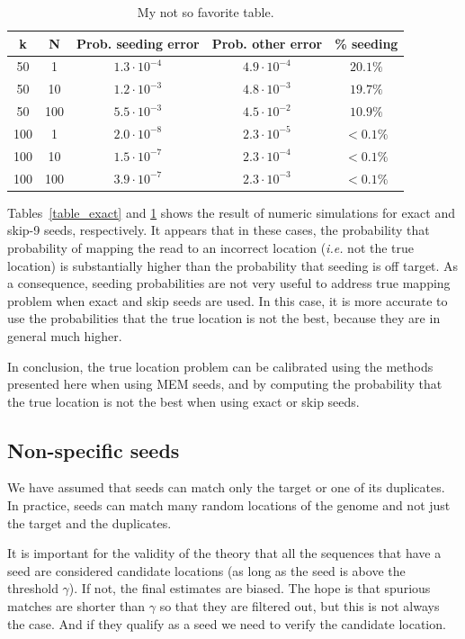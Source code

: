 \documentclass{article}
\begin{document}
\begin{table}
\renewcommand{\arraystretch}{1.1}
\centering
\begin{tabular}{ccccc}
k & N & Prob. seeding error & Prob. other error & \% seeding \\
\hline
50  &  1  & $1.3 \cdot 10^{-4}$ & $4.9 \cdot 10^{-4}$ & $20.1\%$ \\
50  & 10  & $1.2 \cdot 10^{-3}$ & $4.8 \cdot 10^{-3}$ & $19.7\%$ \\
50  & 100 & $5.5 \cdot 10^{-3}$ & $4.5 \cdot 10^{-2}$ & $10.9\%$ \\
100 &  1  & $2.0 \cdot 10^{-8}$ & $2.3 \cdot 10^{-5}$ & $< 0.1\%$ \\
100 & 10  & $1.5 \cdot 10^{-7}$ & $2.3 \cdot 10^{-4}$ & $< 0.1\%$ \\
100 & 100 & $3.9 \cdot 10^{-7}$ & $2.3 \cdot 10^{-3}$ & $< 0.1\%$
\end{tabular}
\caption{My not so favorite table.}
\label{table_skip}
\end{table}

Tables~\ref{table_exact} and \ref{table_skip} shows the result of numeric
simulations for exact and skip-9 seeds, respectively. It appears that in
these cases, the probability that probability of mapping the read to an
incorrect location (\textit{i.e.} not the true location) is substantially
higher than the probability that seeding is off target. As a consequence,
seeding probabilities are not very useful to address true mapping problem
when exact and skip seeds are used. In this case, it is more accurate to
use the probabilities that the true location is not the best, because
they are in general much higher.

In conclusion, the true location problem can be calibrated using the
methods presented here when using MEM seeds, and by computing the
probability that the true location is not the best when using exact or
skip seeds.


\subsection{Non-specific seeds}
\label{sec:random_seeds}

We have assumed that seeds can match only the target or one of its
duplicates. In practice, seeds can match many random locations of the
genome and not just the target and the duplicates.

It is important for the validity of the theory that all the sequences that
have a seed are considered candidate locations (as long as the seed is
above the threshold $\gamma$). If not, the final estimates are biased. The
hope is that spurious matches are shorter than $\gamma$ so that they are
filtered out, but this is not always the case. And if they qualify as a
seed we need to verify the candidate location.
\end{document}
